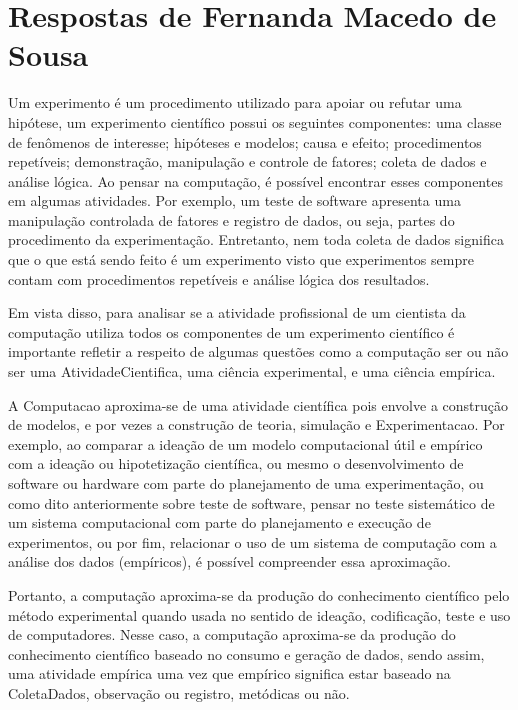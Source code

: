 \section{Respostas de Fernanda Macedo de Sousa\label{tarefa-fernandams-componentes-eperimento}}

Um \gls{experimento} é um procedimento utilizado para apoiar ou refutar uma hipótese, um experimento científico possui os seguintes componentes: uma classe de fenômenos de interesse; hipóteses e modelos; causa e efeito; procedimentos repetíveis; demonstração, manipulação e controle de fatores; coleta de dados e análise lógica. Ao pensar na computação, é possível encontrar esses componentes em algumas atividades. Por exemplo, um teste de software apresenta uma manipulação controlada de fatores e registro de dados, ou seja, partes do procedimento da experimentação. Entretanto, nem toda coleta de dados significa que o que está sendo feito é um experimento visto que experimentos sempre contam com procedimentos repetíveis e análise lógica dos resultados.

Em vista disso, para analisar se a atividade profissional de um cientista da computação utiliza todos os componentes de um experimento científico é importante refletir a respeito de algumas questões como a computação ser ou não ser uma \gls{AtividadeCientifica}, uma ciência experimental, e uma ciência empírica.

A \gls{Computacao} aproxima-se de uma atividade científica pois envolve a construção de modelos, e por vezes a construção de teoria, simulação e \gls{Experimentacao}. Por exemplo, ao comparar a ideação de um modelo computacional útil e empírico com a ideação ou hipotetização científica, ou mesmo o desenvolvimento de software ou hardware com parte do planejamento de uma experimentação, ou como dito anteriormente sobre teste de software, pensar no teste sistemático de um sistema computacional com parte do planejamento e execução de experimentos, ou por fim, relacionar o uso de um sistema de computação com a análise dos dados (empíricos), é possível compreender essa aproximação.

Portanto, a computação aproxima-se da produção do conhecimento científico pelo método experimental quando usada no sentido de ideação, codificação, teste e uso de computadores.  Nesse caso, a computação aproxima-se da produção do conhecimento científico baseado no consumo e geração de dados, sendo assim, uma atividade empírica uma vez que empírico significa estar baseado na \gls{ColetaDados}, observação ou registro, metódicas ou não.